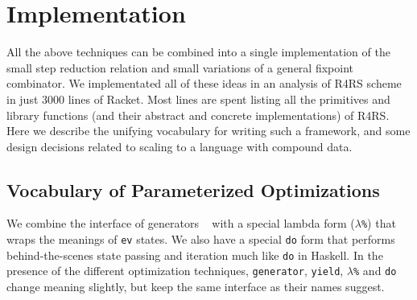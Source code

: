 \documentclass[preprint]{sigplanconf}
\begin{document}
\section{Implementation}

All the above techniques can be combined into a single implementation
of the small step reduction relation and small variations of a general
fixpoint combinator. We implementated all of these ideas in an
analysis of R4RS scheme in just 3000 lines of Racket. Most lines are
spent listing all the primitives and library functions (and their
abstract and concrete implementations) of R4RS. Here we describe the
unifying vocabulary for writing such a framework, and some design
decisions related to scaling to a language with compound data.

\subsection{Vocabulary of Parameterized Optimizations}

We combine the interface of generators ~\cite{ianjohnson:cluhistory}
with a special lambda form ({\tt $\lambda$\%}) that wraps the meanings
of {\tt ev} states. We also have a special {\tt do} form that performs
behind-the-scenes state passing and iteration much like {\tt do} in
Haskell. In the presence of the different optimization
techniques, {\tt generator}, {\tt yield}, {\tt $\lambda$\%} and {\tt do}
change meaning slightly, but keep the same interface as their names
suggest.
\end{document}
